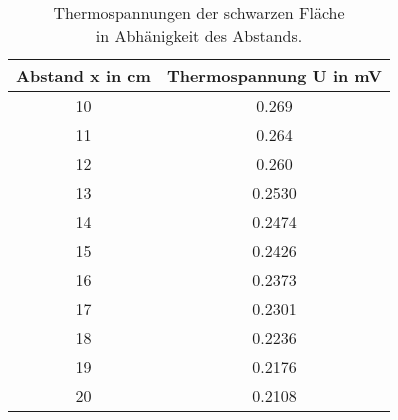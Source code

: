 \begin{table}
  \centering
  \begin{tabular}{c c}
    \toprule
    Abstand x in cm & Thermospannung U in \si{\milli\volt}\\
    \midrule
    10 & 0.269  \\
    11 & 0.264  \\
    12 & 0.260  \\
    13 & 0.2530 \\
    14 & 0.2474 \\
    15 & 0.2426 \\
    16 & 0.2373 \\
    17 & 0.2301 \\
    18 & 0.2236 \\
    19 & 0.2176 \\
    20 & 0.2108 \\
    \bottomrule
  \end{tabular}
 \caption{Thermospannungen der schwarzen Fläche\\in Abhänigkeit des Abstands.}
\end{table}
